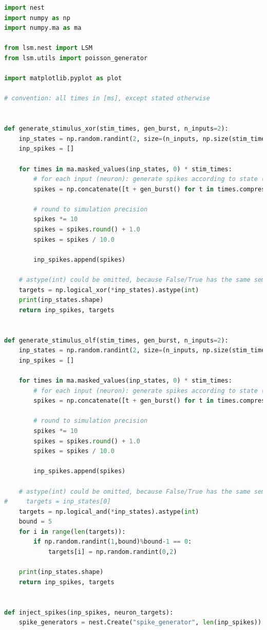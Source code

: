 \begin{lstlisting}[language=Python]
import nest
import numpy as np
import numpy.ma as ma

from lsm.nest import LSM
from lsm.utils import poisson_generator

import matplotlib.pyplot as plot

# convention: all times in [ms], except stated otherwise


def generate_stimulus_xor(stim_times, gen_burst, n_inputs=2):
    inp_states = np.random.randint(2, size=(n_inputs, np.size(stim_times)))
    inp_spikes = []

    for times in ma.masked_values(inp_states, 0) * stim_times:
        # for each input (neuron): generate spikes according to state (=1) and stimulus time-grid
        spikes = np.concatenate([t + gen_burst() for t in times.compressed()])

        # round to simulation precision
        spikes *= 10
        spikes = spikes.round() + 1.0
        spikes = spikes / 10.0

        inp_spikes.append(spikes)

    # astype(int) could be omitted, because False/True has the same semantics
    targets = np.logical_xor(*inp_states).astype(int)
    print(inp_states.shape)
    return inp_spikes, targets


def generate_stimulus_olf(stim_times, gen_burst, n_inputs=2):
    inp_states = np.random.randint(2, size=(n_inputs, np.size(stim_times)))
    inp_spikes = []

    for times in ma.masked_values(inp_states, 0) * stim_times:
        # for each input (neuron): generate spikes according to state (=1) and stimulus time-grid
        spikes = np.concatenate([t + gen_burst() for t in times.compressed()])

        # round to simulation precision
        spikes *= 10
        spikes = spikes.round() + 1.0
        spikes = spikes / 10.0

        inp_spikes.append(spikes)

    # astype(int) could be omitted, because False/True has the same semantics
#     targets = inp_states[0]
    targets = np.logical_and(*inp_states).astype(int)
    bound = 5
    for i in range(len(targets)):
        if np.random.randint(1,bound)%bound-1 == 0:
            targets[i] = np.random.randint(0,2)
            
    print(inp_states.shape)
    return inp_spikes, targets


def inject_spikes(inp_spikes, neuron_targets):
    spike_generators = nest.Create("spike_generator", len(inp_spikes))


\end{lstlisting}
